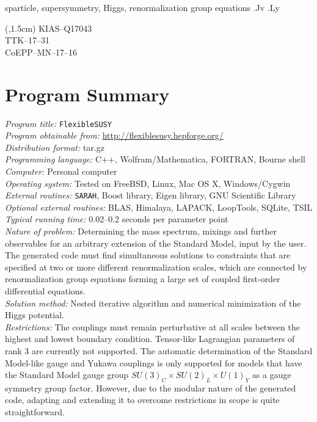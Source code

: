 \documentclass[final,3p,11pt,pdflatex]{elsarticle}
\makeatletter
\newcommand{\sarah}{\texttt{SARAH}\@\xspace}
\newcommand{\fs}{\texttt{FlexibleSUSY}\@\xspace}
\makeatother
\begin{document}
\begin{frontmatter}
\begin{keyword}
sparticle,
supersymmetry,
Higgs,
renormalization group equations
.Jv
.Ly
\end{keyword}
\end{frontmatter}

\begin{textblock*}{10em}(\textwidth,1.5cm)
\raggedleft\noindent\footnotesize
KIAS--Q17043 \\
TTK--17--31 \\
CoEPP--MN--17--16
\end{textblock*}

\clearpage
{}
\section*{Program Summary}
\noindent
{\em Program title:} \fs\\[0.5em]
{\em Program obtainable from:} \url{http://flexiblesusy.hepforge.org/}\\[0.5em]
{\em Distribution format:} tar.gz\\[0.5em]
{\em Programming language:} C++, Wolfram/Mathematica, FORTRAN, Bourne shell\\[0.5em]
{\em Computer:} Personal computer\\[0.5em]
{\em Operating system:} Tested on FreeBSD, Linux, Mac OS X, Windows/Cygwin\\[0.5em]
{\em External routines:} \sarah, Boost library, Eigen library, GNU Scientific Library\\[0.5em]
{\em Optional external routines:} BLAS, Himalaya, LAPACK, LoopTools, SQLite, TSIL\\[0.5em]
{\em Typical running time:} 0.02--0.2 seconds per parameter point\\[0.5em]
{\em Nature of problem:}
%
Determining the mass spectrum, mixings and further observables for an arbitrary extension
of the Standard Model, input by the user. The generated code must find
simultaneous solutions to constraints that are specified at two or
more different renormalization scales, which are connected by
renormalization group equations forming a large set of coupled
first-order differential
equations. \\[0.5em]
%
{\em Solution method:}
%
Nested iterative algorithm and numerical
minimization of the Higgs potential.\\[0.5em]
%
{\em Restrictions:}
%
The couplings must remain perturbative at all scales between the
highest and lowest boundary condition.  Tensor-like Lagrangian
parameters of rank 3 are currently not supported.  The automatic
determination of the Standard Model-like gauge and Yukawa couplings is
only supported for models that have the Standard Model gauge group
$SU(3)_C\times SU(2)_L\times U(1)_Y$ as a gauge symmetry group factor.
However, due to the modular nature of the generated code, adapting and
extending it to overcome restrictions in scope is quite straightforward.
\end{document}

